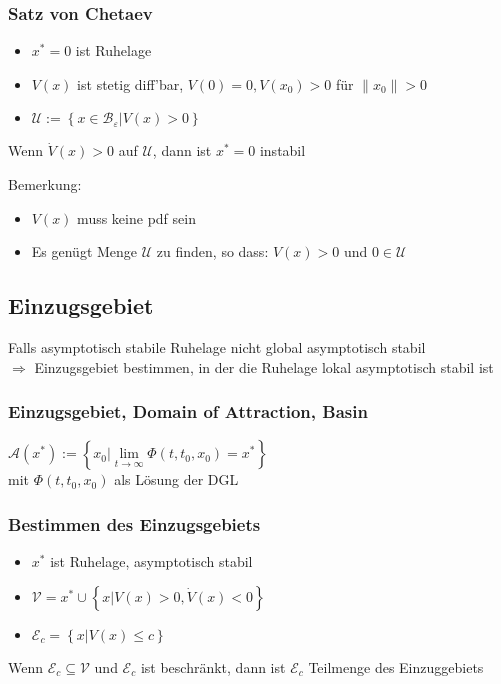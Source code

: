 \documentclass[6pt,a4paper,fleqn]{scrartcl}
\begin{document}
\begin{multicols*}{4}
\subsubsection*{Satz von Chetaev}
\begin{itemize}
  \item $x^* = 0$ ist Ruhelage
  \item $V(x)$ ist stetig diff'bar, $V(0)=0, V(x_0)>0$ für $\|x_0\| > 0$
  \item $\mathcal{U} := \left\{ x \in \mathcal{B}_\varepsilon | V(x) > 0 \right\}$
\end{itemize}
Wenn $\dot{V}(x) > 0$ auf $\mathcal{U}$, dann ist $x^*=0$ instabil

Bemerkung:\\
\begin{itemize}
  \item $V(x)$ muss keine pdf sein
  \item Es genügt Menge $\mathcal{U}$ zu finden, so dass: $V(x) > 0$ und $0 \in \mathcal{U}$
\end{itemize}


\subsection{Einzugsgebiet}
Falls asymptotisch stabile Ruhelage nicht global asymptotisch stabil \\
$\Rightarrow$ Einzugsgebiet bestimmen, in der die Ruhelage lokal asymptotisch stabil ist

\subsubsection*{Einzugsgebiet, Domain of Attraction, Basin}
$\mathcal{A}(x^*) := \left\{ x_0 | \lim\limits_{t \rightarrow \infty} \Phi(t,t_0,x_0) = x^* \right\}$ \\
mit $\Phi(t,t_0,x_0)$ als Lösung der DGL

\subsubsection*{Bestimmen des Einzugsgebiets}
\begin{itemize}
  \item $x^*$ ist Ruhelage, asymptotisch stabil
  \item $\mathcal{V} = {x^*} \cup \left\{ x | V(x) > 0, \dot{V}(x) < 0 \right\}$
  \item $\mathcal{E}_c = \left\{ x | V(x) \leq c \right\}$
\end{itemize}
Wenn $\mathcal{E}_c \subseteq \mathcal{V}$ und $\mathcal{E}_c$ ist beschränkt, dann ist $\mathcal{E}_c$ Teilmenge des Einzuggebiets



\end{multicols*}
\end{document}

